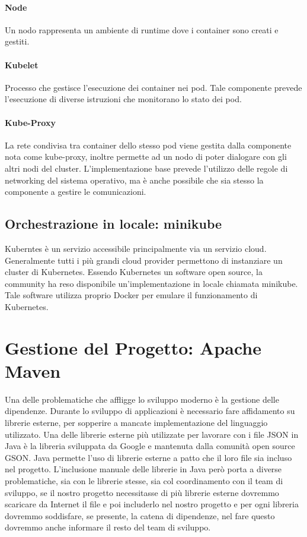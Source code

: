 \paragraph{Node}
Un nodo rappresenta un ambiente di runtime dove i container sono creati e gestiti.

\paragraph{Kubelet}
Processo che gestisce l'esecuzione dei container nei pod. Tale componente prevede l'esecuzione di diverse istruzioni che monitorano lo stato dei pod.

\paragraph{Kube-Proxy}
La rete condivisa tra container dello stesso pod viene gestita dalla componente nota come kube-proxy, inoltre permette ad un nodo di poter dialogare con gli altri nodi del cluster. L'implementazione base prevede l'utilizzo delle regole di networking del sistema operativo, ma è anche possibile che sia stesso la componente a gestire le comunicazioni.

\subsection{Orchestrazione in locale: minikube}
Kuberntes è un servizio accessibile principalmente via un servizio cloud. Generalmente tutti i più grandi cloud provider permettono di instanziare un cluster di Kubernetes. Essendo Kubernetes un software open source, la community ha reso disponibile un'implementazione in locale chiamata minikube. Tale software utilizza proprio Docker per emulare il funzionamento di Kubernetes.

\section{Gestione del Progetto: Apache Maven}
Una delle problematiche che affligge lo sviluppo moderno è la gestione delle dipendenze. Durante lo sviluppo di applicazioni è necessario fare affidamento su librerie esterne, per sopperire a mancate implementazione del linguaggio utilizzato. Una delle librerie esterne più utilizzate per lavorare con i file \ac{JSON} in Java è la libreria sviluppata da Google e mantenuta dalla comunità open source GSON. Java permette l'uso di librerie esterne a patto che il loro file sia incluso nel progetto. L'inclusione manuale delle librerie in Java però porta a diverse problematiche, sia con le librerie stesse, sia col coordinamento con il team di sviluppo, se il nostro progetto necessitasse di più librerie esterne dovremmo scaricare da Internet il file e poi includerlo nel nostro progetto e per ogni libreria dovremmo soddisfare, se presente, la catena di dipendenze, nel fare questo dovremmo anche informare il resto del team di sviluppo. 

